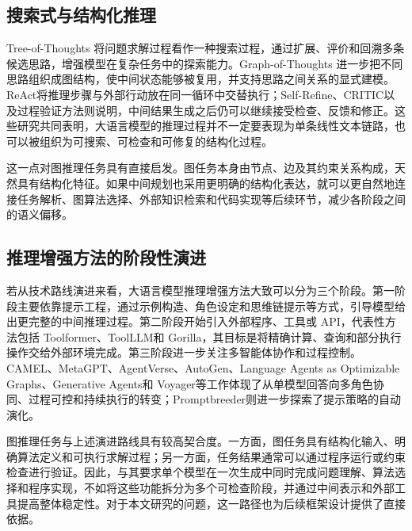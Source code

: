 \subsection{搜索式与结构化推理}

Tree-of-Thoughts 将问题求解过程看作一种搜索过程，通过扩展、评价和回溯多条候选思路，增强模型在复杂任务中的探索能力\cite{yao2023tree}。Graph-of-Thoughts 进一步把不同思路组织成图结构，使中间状态能够被复用，并支持思路之间关系的显式建模\cite{besta2024graph}。ReAct\cite{yao2023react}将推理步骤与外部行动放在同一循环中交替执行；Self-Refine\cite{madaan2023selfrefine}、CRITIC\cite{critic2024}以及过程验证方法\cite{lightman2023processreward}则说明，中间结果生成之后仍可以继续接受检查、反馈和修正。这些研究共同表明，大语言模型的推理过程并不一定要表现为单条线性文本链路，也可以被组织为可搜索、可检查和可修复的结构化过程。

这一点对图推理任务具有直接启发。图任务本身由节点、边及其约束关系构成，天然具有结构化特征。如果中间规划也采用更明确的结构化表达，就可以更自然地连接任务解析、图算法选择、外部知识检索和代码实现等后续环节，减少各阶段之间的语义偏移。

\subsection{推理增强方法的阶段性演进}

若从技术路线演进来看，大语言模型推理增强方法大致可以分为三个阶段。第一阶段主要依靠提示工程，通过示例构造、角色设定和思维链提示等方式，引导模型给出更完整的中间推理过程。第二阶段开始引入外部程序、工具或 API，代表性方法包括 Toolformer\cite{schick2023toolformer}、ToolLLM\cite{qin2023toolllm}和 Gorilla\cite{gorilla2024}，其目标是将精确计算、查询和部分执行操作交给外部环境完成。第三阶段进一步关注多智能体协作和过程控制。CAMEL\cite{camel2023}、MetaGPT\cite{metagpt2023}、AgentVerse\cite{agentverse2023}、AutoGen\cite{wu2023autogen}、Language Agents as Optimizable Graphs\cite{zhuge2024languageagents}、Generative Agents\cite{park2023generativeagents}和 Voyager\cite{wang2023voyager}等工作体现了从单模型回答向多角色协同、过程可控和持续执行的转变；Promptbreeder\cite{zhou2023promptbreeder}则进一步探索了提示策略的自动演化。

图推理任务与上述演进路线具有较高契合度。一方面，图任务具有结构化输入、明确算法定义和可执行求解过程；另一方面，任务结果通常可以通过程序运行或约束检查进行验证。因此，与其要求单个模型在一次生成中同时完成问题理解、算法选择和程序实现，不如将这些功能拆分为多个可检查阶段，并通过中间表示和外部工具提高整体稳定性。对于本文研究的问题，这一路径也为后续框架设计提供了直接依据。

